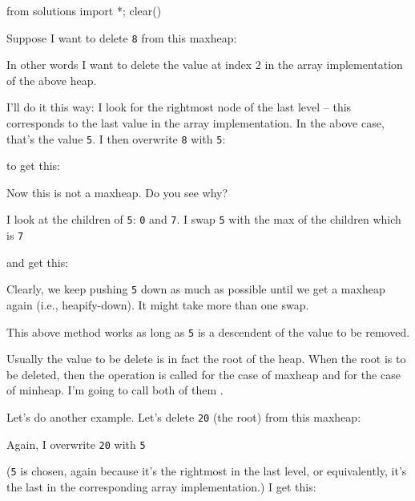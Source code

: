 \begin{python0}
  from solutions import *; clear()
\end{python0}

Suppose I want to delete
\texttt{8}
from this maxheap:



In other words I want to delete the value at index 2
in the array implementation of the above heap.

I'll do it this way:
I look for the rightmost node of the last level --
this corresponds to the last value in the array implementation.
In the above case, that's the value \texttt{5}.
I then overwrite \texttt{8} with \texttt{5}:



to get this:



Now this is not a maxheap. Do you see why?

I look at the children of \texttt{5}: \texttt{0} and \texttt{7}.
I swap \texttt{5} with the max of the children which is \texttt{7}



and get this:



Clearly, we keep pushing \texttt{5} down as much as possible until
we get a maxheap again (i.e., heapify-down).
It might take more than one swap.

This above method works as long as \texttt{5} is a descendent of the
value to be removed.

Usually the value to be delete is in fact the root of the heap.
When the root is to be deleted, then the operation is called
 for the case of maxheap
and  for the case of
minheap.
I'm going to call both of them .

Let's do another example.
Let's delete \texttt{20} (the root) from this maxheap:




Again, I overwrite \texttt{20} with \texttt{5}



(\texttt{5} is chosen, again because it's the rightmost
in the last level, or equivalently, it's the last in the
corresponding array implementation.)
I get this:



